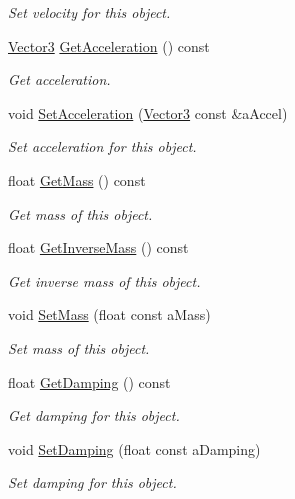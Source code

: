 \begin{DoxyCompactItemize}
\begin{DoxyCompactList}\small\item\em Set velocity for this object. \end{DoxyCompactList}\item 
\hyperlink{structVector3}{Vector3} \hyperlink{classPhysicsObject_a1fbc66747331914e3bb528a8dba7e1de}{Get\+Acceleration} () const 
\begin{DoxyCompactList}\small\item\em Get acceleration. \end{DoxyCompactList}\item 
void \hyperlink{classPhysicsObject_aa8aa775eb80a567441853b6522f934fe}{Set\+Acceleration} (\hyperlink{structVector3}{Vector3} const \&a\+Accel)
\begin{DoxyCompactList}\small\item\em Set acceleration for this object. \end{DoxyCompactList}\item 
float \hyperlink{classPhysicsObject_a7da622e50716e5448c1c5a164a2fbd1d}{Get\+Mass} () const 
\begin{DoxyCompactList}\small\item\em Get mass of this object. \end{DoxyCompactList}\item 
float \hyperlink{classPhysicsObject_aba6ab4d7b6fdcd6796f502be5cbe0e8e}{Get\+Inverse\+Mass} () const 
\begin{DoxyCompactList}\small\item\em Get inverse mass of this object. \end{DoxyCompactList}\item 
void \hyperlink{classPhysicsObject_a72af82678d346cbb4e1d64e68292cd08}{Set\+Mass} (float const a\+Mass)
\begin{DoxyCompactList}\small\item\em Set mass of this object. \end{DoxyCompactList}\item 
float \hyperlink{classPhysicsObject_a69aae2f424db9d0b6250b36a24984704}{Get\+Damping} () const 
\begin{DoxyCompactList}\small\item\em Get damping for this object. \end{DoxyCompactList}\item 
void \hyperlink{classPhysicsObject_a540fc51c166b2e7d21c10f53c6f92768}{Set\+Damping} (float const a\+Damping)
\begin{DoxyCompactList}\small\item\em Set damping for this object. \end{DoxyCompactList}\item 

\end{DoxyCompactItemize}
